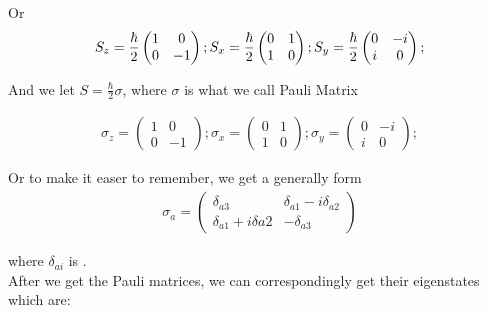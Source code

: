 Or 
\begin{align*}
	S_z=\frac{\hbar}{2}\begin{pmatrix}
		1&0\\0&-1
	\end{pmatrix}; S_x=\frac{\hbar}{2}\begin{pmatrix}
		0&1\\1&0
	\end{pmatrix}; S_y=\frac{\hbar}{2}\begin{pmatrix}
		0&-i\\i&0
	\end{pmatrix};
\end{align*}

And we let $S=\frac{\hbar}{2}\sigma$, where $\sigma$ is what we call Pauli Matrix

\begin{align*}
\boxed{
	\sigma_z=\begin{pmatrix}
		1&0\\0&-1
	\end{pmatrix}; \sigma_x=\begin{pmatrix}
		0&1\\1&0
	\end{pmatrix}; \sigma_y=\begin{pmatrix}
		0&-i\\i&0
	\end{pmatrix};}
\end{align*}

Or to make it easer to remember, we get a generally form 
\begin{align*}
	\sigma_a=\begin{pmatrix}
		\delta_{a3}&\delta_{a1}-i\delta_{a2}\\
		\delta_{a1}+i\delta{a2}&-\delta_{a3}
	\end{pmatrix}
\end{align*}

where $\delta_{ai}$ is . \\

After we get the Pauli matrices, we can correspondingly get their eigenstates which are:

